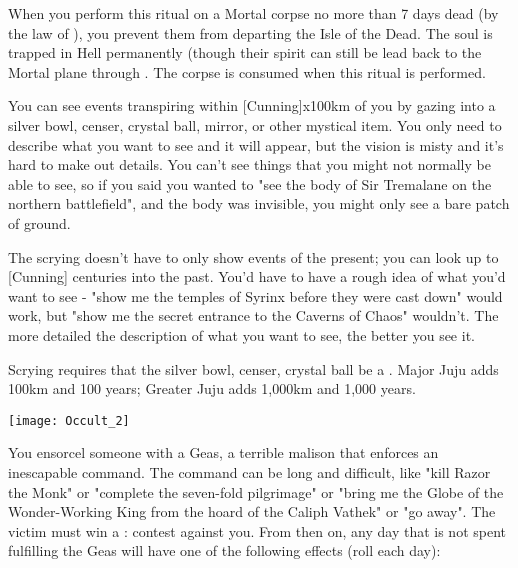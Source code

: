 When you perform this ritual on a Mortal corpse no more than 7 days dead (by the law of \TheAuthority), you prevent them from departing the Isle of the Dead.  The soul is trapped in Hell permanently (though their spirit can still be lead back to the Mortal plane through .  The corpse is consumed when this ritual is performed.


\OCCULT[
  Name=Descry,
  Link=occultism-descry,
  Success=3+,
  Cost=See below
]

You can see events transpiring within [Cunning]x100km of you by gazing into a silver bowl, censer, crystal ball, mirror, or other mystical item.  You only need to describe what you want to see and it will appear, but the vision is misty and it's hard to make out details.  You can't see things that you might not normally be able to see, so if you said you wanted to "see the body of Sir Tremalane on the northern battlefield", and the body was invisible, you might only see a bare patch of ground.  

The scrying doesn't have to only show events of the present; you can look up to [Cunning] centuries into the past.  You'd have to have a rough idea of what you'd want to see - "show me the temples of Syrinx before they were cast down" would work, but "show me the secret entrance to the Caverns of Chaos" wouldn't.  The more detailed the description of what you want to see, the better you see it.

Scrying requires that the silver bowl, censer, crystal ball be a .  Major Juju adds 100km and 100 years; Greater Juju adds 1,000km and 1,000 years.

  \begin{center}
  \texttt{[image: Occult\_2]}
  \end{center}



\OCCULT[
  Name=Geas,
  Link=occultism-geas,
  Success=12,
  Cost=666\AU
]


You ensorcel someone with a Geas, a terrible malison that enforces an inescapable command. The command can be long and difficult, like "kill Razor the Monk" or "complete the seven-fold pilgrimage" or "bring me the Globe of the Wonder-Working King from the hoard of the Caliph Vathek" or "go away". The victim must win a \RB : \FOC contest against you.  From then on, any day that is not spent fulfilling the Geas will have one of the following effects (roll each day):

